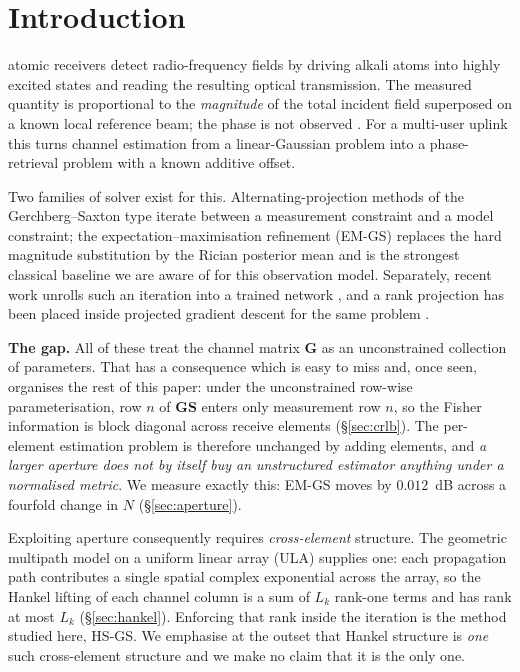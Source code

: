 \documentclass[journal]{IEEEtran}
\newcommand{\bG}{\mathbf{G}}
\newcommand{\bS}{\mathbf{S}}
\begin{document}
\section{Introduction}

 atomic receivers detect radio-frequency fields by
driving alkali atoms into highly excited states and reading the resulting
optical transmission. The measured quantity is proportional to the
\emph{magnitude} of the total incident field superposed on a known local
reference beam; the phase is not observed
\cite{cui2025,gong2025mag,zhang2024}. For a multi-user uplink this turns
channel estimation from a linear-Gaussian problem into a phase-retrieval
problem with a known additive offset.

Two families of solver exist for this. Alternating-projection methods of the
Gerchberg--Saxton type \cite{gerchberg1972} iterate between a measurement
constraint and a model constraint; the expectation--maximisation refinement
(EM-GS) replaces the hard magnitude substitution by the Rician posterior mean
and is the strongest classical baseline we are aware of for this observation
model. Separately, recent work unrolls such an iteration into a trained
network \cite{xiao2026}, and a rank projection has been placed inside projected
gradient descent for the same problem \cite{xu2025}.

\textbf{The gap.} All of these treat the channel matrix $\bG$ as an
unconstrained collection of parameters. That has a consequence which is easy to
miss and, once seen, organises the rest of this paper: under the unconstrained
row-wise parameterisation, row $n$ of $\bG\bS$ enters only measurement row $n$,
so the Fisher information is block diagonal across receive elements
(\S\ref{sec:crlb}). The per-element estimation problem is therefore unchanged
by adding elements, and \emph{a larger aperture does not by itself buy an
unstructured estimator anything under a normalised metric}. We measure exactly
this: EM-GS moves by $0.012$~dB across a fourfold change in $N$
(\S\ref{sec:aperture}).

Exploiting aperture consequently requires \emph{cross-element} structure. The
geometric multipath model on a uniform linear array (ULA) supplies one: each
propagation path contributes a single spatial complex exponential across the
array, so the Hankel lifting of each channel column is a sum of $L_k$ rank-one
terms and has rank at most $L_k$ (\S\ref{sec:hankel}). Enforcing that rank
inside the iteration is the method studied here, HS-GS. We emphasise at the
outset that Hankel structure is \emph{one} such cross-element structure and we
make no claim that it is the only one.
\end{document}
